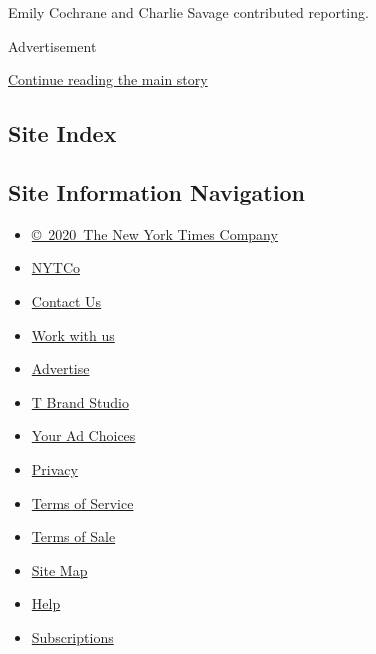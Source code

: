 Emily Cochrane and Charlie Savage contributed reporting.

Advertisement

\protect\hyperlink{after-bottom}{Continue reading the main story}

\hypertarget{site-index}{%
\subsection{Site Index}\label{site-index}}

\hypertarget{site-information-navigation}{%
\subsection{Site Information
Navigation}\label{site-information-navigation}}

\begin{itemize}
\tightlist
\item
  \href{https://help.nytimes3xbfgragh.onion/hc/en-us/articles/115014792127-Copyright-notice}{©~2020~The
  New York Times Company}
\end{itemize}

\begin{itemize}
\tightlist
\item
  \href{https://www.nytco.com/}{NYTCo}
\item
  \href{https://help.nytimes3xbfgragh.onion/hc/en-us/articles/115015385887-Contact-Us}{Contact
  Us}
\item
  \href{https://www.nytco.com/careers/}{Work with us}
\item
  \href{https://nytmediakit.com/}{Advertise}
\item
  \href{http://www.tbrandstudio.com/}{T Brand Studio}
\item
  \href{https://www.nytimes3xbfgragh.onion/privacy/cookie-policy\#how-do-i-manage-trackers}{Your
  Ad Choices}
\item
  \href{https://www.nytimes3xbfgragh.onion/privacy}{Privacy}
\item
  \href{https://help.nytimes3xbfgragh.onion/hc/en-us/articles/115014893428-Terms-of-service}{Terms
  of Service}
\item
  \href{https://help.nytimes3xbfgragh.onion/hc/en-us/articles/115014893968-Terms-of-sale}{Terms
  of Sale}
\item
  \href{https://spiderbites.nytimes3xbfgragh.onion}{Site Map}
\item
  \href{https://help.nytimes3xbfgragh.onion/hc/en-us}{Help}
\item
  \href{https://www.nytimes3xbfgragh.onion/subscription?campaignId=37WXW}{Subscriptions}
\end{itemize}
